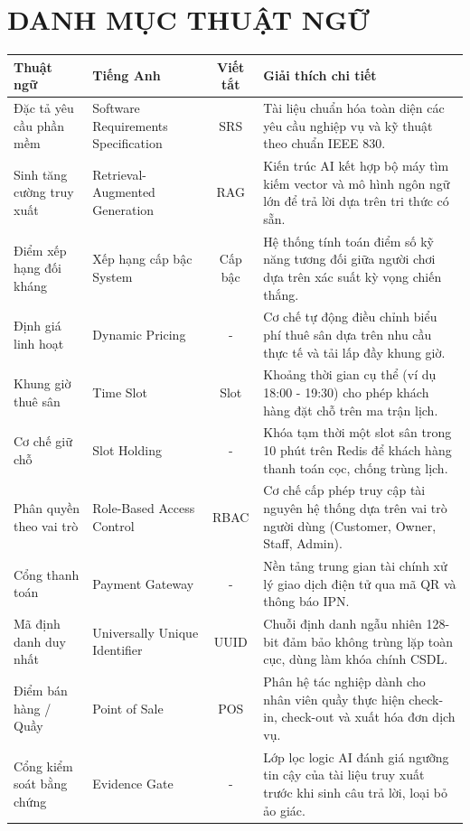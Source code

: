 
\chapter*{DANH MỤC THUẬT NGỮ}

\begin{table}[htbp]
\centering
\small
\begin{tabularx}{\textwidth}{>{\raggedright\arraybackslash}p{2.8cm} >{\raggedright\arraybackslash}p{3.2cm} c >{\raggedright\arraybackslash}X}
    \toprule
    \textbf{Thuật ngữ} & \textbf{Tiếng Anh} & \textbf{Viết tắt} & \textbf{Giải thích chi tiết} \\
    \midrule
    Đặc tả yêu cầu phần mềm & Software Requirements Specification & SRS & Tài liệu chuẩn hóa toàn diện các yêu cầu nghiệp vụ và kỹ thuật theo chuẩn IEEE 830. \\
    Sinh tăng cường truy xuất & Retrieval-Augmented Generation & RAG & Kiến trúc AI kết hợp bộ máy tìm kiếm vector và mô hình ngôn ngữ lớn để trả lời dựa trên tri thức có sẵn. \\
    Điểm xếp hạng đối kháng & Xếp hạng cấp bậc System & Cấp bậc & Hệ thống tính toán điểm số kỹ năng tương đối giữa người chơi dựa trên xác suất kỳ vọng chiến thắng. \\
    Định giá linh hoạt & Dynamic Pricing & - & Cơ chế tự động điều chỉnh biểu phí thuê sân dựa trên nhu cầu thực tế và tải lấp đầy khung giờ. \\
    Khung giờ thuê sân & Time Slot & Slot & Khoảng thời gian cụ thể (ví dụ 18:00 - 19:30) cho phép khách hàng đặt chỗ trên ma trận lịch. \\
    Cơ chế giữ chỗ & Slot Holding & - & Khóa tạm thời một slot sân trong 10 phút trên Redis để khách hàng thanh toán cọc, chống trùng lịch. \\
    Phân quyền theo vai trò & Role-Based Access Control & RBAC & Cơ chế cấp phép truy cập tài nguyên hệ thống dựa trên vai trò người dùng (Customer, Owner, Staff, Admin). \\
    Cổng thanh toán & Payment Gateway & - & Nền tảng trung gian tài chính xử lý giao dịch điện tử qua mã QR và thông báo IPN. \\
    Mã định danh duy nhất & Universally Unique Identifier & UUID & Chuỗi định danh ngẫu nhiên 128-bit đảm bảo không trùng lặp toàn cục, dùng làm khóa chính CSDL. \\
    Điểm bán hàng / Quầy & Point of Sale & POS & Phân hệ tác nghiệp dành cho nhân viên quầy thực hiện check-in, check-out và xuất hóa đơn dịch vụ. \\
    Cổng kiểm soát bằng chứng & Evidence Gate & - & Lớp lọc logic AI đánh giá ngưỡng tin cậy của tài liệu truy xuất trước khi sinh câu trả lời, loại bỏ ảo giác. \\
    \bottomrule
\end{tabularx}
\end{table}

\clearpage
